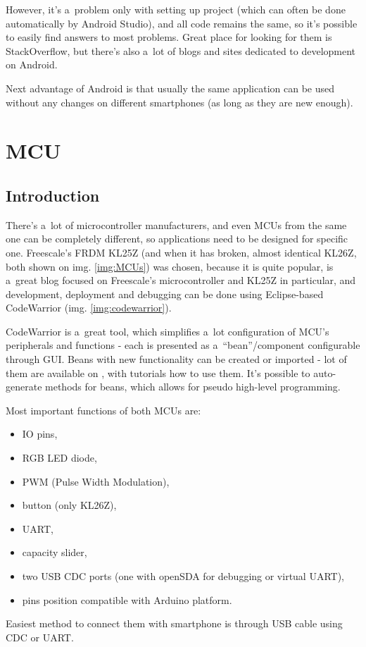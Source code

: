 However, it's a~problem only with setting up project (which can often be done
automatically by Android Studio), and all code remains the same, so it's
possible to easily find answers to most problems.
Great place for looking for them is StackOverflow, but there's also a~lot of
blogs and sites dedicated to development on Android.

Next advantage of Android is that usually the same application can be used
without any changes on different smartphones (as long as they are new enough).

\clearpage

\section{MCU}
\subsection{Introduction}
There's a~lot of microcontroller manufacturers, and even MCUs from the same one
can be completely different, so applications need to be designed for specific
one.
Freescale's FRDM KL25Z (and when it has broken, almost identical KL26Z, both
shown on img. \ref{img:MCUs}) was chosen, because it is quite popular,
\cite{mcu_on_eclipse} is a~great blog focused on Freescale's microcontroller and KL25Z in particular, and development, deployment and debugging can be done using
Eclipse-based CodeWarrior (img. \ref{img:codewarrior}).

CodeWarrior is a~great tool, which simplifies a~lot configuration of MCU's
peripherals and functions - each is presented as a~``bean''/component
configurable through GUI.
Beans with new functionality can be created or imported - lot of them are
available on \cite{mcu_on_eclipse}, with tutorials how to use them.
It's possible to auto-generate methods for beans, which allows for pseudo
high-level programming.

Most important functions of both MCUs are:
\begin{itemize}
  \item IO pins,
  \item RGB LED diode,
  \item PWM (Pulse Width Modulation),
  \item button (only KL26Z),
  \item UART,
  \item capacity slider,
  \item two USB CDC ports (one with openSDA for debugging or virtual UART),
  \item pins position compatible with Arduino platform.
\end{itemize}
Easiest method to connect them with smartphone is through USB cable using CDC or
UART.

